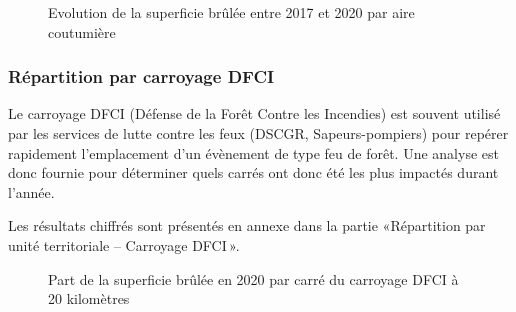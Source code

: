 \documentclass[
  11pt,
  letterpaper,
]{scrreprt}
\begin{document}
\begin{figure}[H]


\caption{\label{fig-graph-evol-feux-aire\_coutumiere}Evolution de la
superficie brûlée entre 2017 et 2020 par aire coutumière}

\end{figure}%

\subsubsection{Répartition par carroyage
DFCI}\label{ruxe9partition-par-carroyage-dfci}

Le carroyage DFCI (Défense de la Forêt Contre les Incendies) est souvent
utilisé par les services de lutte contre les feux (DSCGR,
Sapeurs-pompiers) pour repérer rapidement l'emplacement d'un évènement
de type feu de forêt. Une analyse est donc fournie pour déterminer quels
carrés ont donc été les plus impactés durant l'année.

Les résultats chiffrés sont présentés en annexe dans la partie
«Répartition par unité territoriale -- Carroyage DFCI\,».

\begin{figure}[H]


\caption{\label{fig-carte-cloro-feux-dfci}Part de la superficie brûlée
en 2020 par carré du carroyage DFCI à 20 kilomètres}

\end{figure}%
\end{document}
